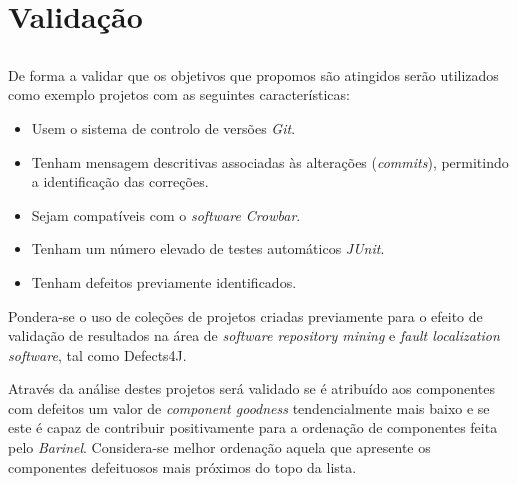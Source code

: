 \chapter{Validação}\label{chap:chap4}

\section*{}

De forma a validar que os objetivos que propomos são atingidos serão utilizados como exemplo projetos com as seguintes características:
%
\begin{itemize}
	\item Usem o sistema de controlo de versões \emph{Git}.
	\item Tenham mensagem descritivas associadas às alterações (\emph{commits}), permitindo a identificação das correções.
	\item Sejam compatíveis com o \emph{software Crowbar}.
	\item Tenham um número elevado de testes automáticos \emph{JUnit}.
	\item Tenham defeitos previamente identificados.
\end{itemize}

Pondera-se o uso de coleções de projetos criadas previamente para o efeito de validação de resultados na área de \emph{software repository mining} e \emph{fault localization software}, tal como Defects4J. %

Através da análise destes projetos será validado se é atribuído aos componentes com defeitos um valor de \emph{component goodness} tendencialmente mais baixo e se este é capaz de contribuir positivamente para a ordenação de componentes feita pelo \emph{Barinel}. Considera-se melhor ordenação aquela que apresente os componentes defeituosos mais próximos do topo da lista.